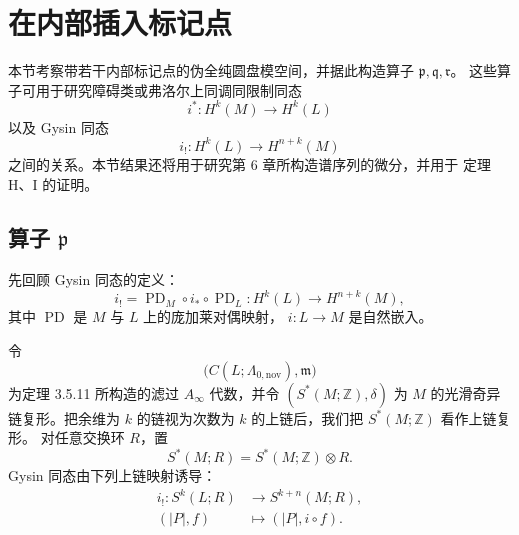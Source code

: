 
\section{在内部插入标记点}
\label{sec:3-8}

本节考察带若干内部标记点的伪全纯圆盘模空间，并据此构造算子
$\mathfrak p,\mathfrak q,\mathfrak r$。
这些算子可用于研究障碍类或弗洛尔上同调同限制同态
\[
 i^*\colon H^k(M)\longrightarrow H^k(L)
\]
以及 Gysin 同态
\[
 i_!\colon H^k(L)\longrightarrow H^{n+k}(M)
\]
之间的关系。本节结果还将用于研究第 6 章所构造谱序列的微分，并用于
定理 H、I 的证明。

\subsection{算子 $\mathfrak p$}
\label{subsec:3-8-1}

先回顾 Gysin 同态的定义：
\[
 i_!
 =\operatorname{PD}_M\circ i_*\circ\operatorname{PD}_L
 \colon H^k(L)\longrightarrow H^{n+k}(M),
\]
其中 $\operatorname{PD}$ 是 $M$ 与 $L$ 上的庞加莱对偶映射，
$i\colon L\to M$ 是自然嵌入。

令
\[
 \bigl(C(L;\Lambda_{0,\mathrm{nov}}),\mathfrak m\bigr)
\]
为定理 3.5.11 所构造的滤过 $A_\infty$ 代数，并令
$(S^*(M;\mathbb Z),\delta)$ 为 $M$ 的光滑奇异链复形。把余维为 $k$
的链视为次数为 $k$ 的上链后，我们把 $S^*(M;\mathbb Z)$ 看作上链复形。
对任意交换环 $R$，置
\[
 S^*(M;R)=S^*(M;\mathbb Z)\otimes R.
\]
Gysin 同态由下列上链映射诱导：
\[
 \begin{aligned}
 i_!\colon S^k(L;R)&\longrightarrow S^{k+n}(M;R),\\
 (|P|,f)&\longmapsto (|P|,i\circ f).
 \end{aligned}
\]

